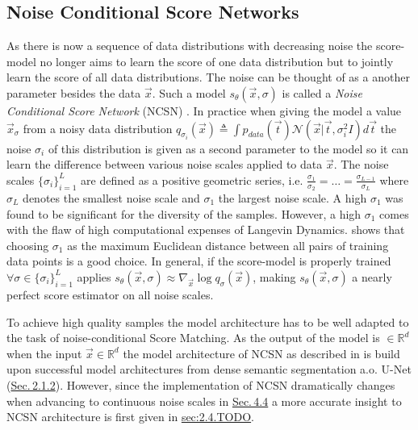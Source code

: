 \subsection{Noise Conditional Score Networks} \label{sec:4.3.1}
As there is now a sequence of data distributions with decreasing noise the score-model no longer aims to learn the score of one data distribution but to jointly learn the score of all data distributions. The noise can be thought of as a another parameter besides the data $\vec{x}$. Such a model $s_\theta(\vec{x}, \sigma)$ is called a \textit{Noise Conditional Score Network} (NCSN) \cite{score_1}. In practice when giving the model a value $\vec{x}_\sigma$ from a noisy data distribution $q_{\sigma_i}(\vec{x})\triangleq\int p_{data}(\vec{t})\mathcal{N}(\vec{x}|\vec{t},\sigma_i^2I)d\vec{t}$ the noise $\sigma_i$ of this distribution is given as a second parameter to the model so it can learn the difference between various noise scales applied to data $\vec{x}$. The noise scales $\{\sigma_i\}_{i=1}^L$ are defined as a positive geometric series, i.e. $\frac{\sigma_1}{\sigma_2}=\dots=\frac{\sigma_{L-1}}{\sigma_L}$ where $\sigma_L$ denotes the smallest noise scale and $\sigma_1$ the largest noise scale. A high $\sigma_1$ was found to be significant for the diversity of the samples. However, a high $\sigma_1$ comes with the flaw of high computational expenses of Langevin Dynamics. \cite{score_2} shows that choosing $\sigma_1$ as the maximum Euclidean distance between all pairs of training data points is a good choice. In general, if the score-model is properly trained $\forall\sigma\in\{\sigma_i\}_{i=1}^L$ applies $s_\theta(\vec{x}, \sigma)\approx\nabla_{\vec{x}}\log q_\sigma(\vec{x})$, making $s_\theta(\vec{x},\sigma)$ a nearly perfect score estimator on all noise scales. 

To achieve high quality samples the model architecture has to be well adapted to the task of noise-conditional Score Matching. As the output of the model is $\in\mathbb{R}^d$ when the input $\vec{x}\in\mathbb{R}^d$ the model architecture of NCSN as described in \cite{score_1} is build upon successful model architectures from dense semantic segmentation a.o. U-Net (\hyperref[sec:2.1.2]{Sec.\,2.1.2}). However, since the implementation of NCSN dramatically changes when advancing to continuous noise scales in \hyperref[sec:4.4]{Sec.\,4.4} a more accurate insight to NCSN architecture is first given in \hyperref[sec:]{sec:2.4.TODO}.

